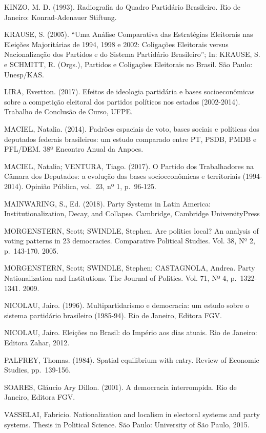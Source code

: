 \documentclass[]{article}
\begin{document}
KINZO, M. D. (1993). Radiografia do Quadro Partidário Brasileiro. Rio de
Janeiro: Konrad-Adenauer Stiftung.

KRAUSE, S. (2005). ``Uma Análise Comparativa das Estratégias Eleitorais
nas Eleições Majoritárias de 1994, 1998 e 2002: Coligações Eleitorais
versus Nacionalização dos Partidos e do Sistema Partidário Brasileiro'';
In: KRAUSE, S. e SCHMITT, R. (Orgs.), Partidos e Coligações Eleitorais
no Brasil. São Paulo: Unesp/KAS.

LIRA, Evertton. (2017). Efeitos de ideologia partidária e bases
socioeconômicas sobre a competição eleitoral dos partidos políticos nos
estados (2002-2014). Trabalho de Conclusão de Curso, UFPE.

MACIEL, Natalia. (2014). Padrões espaciais de voto, bases sociais e
políticas dos deputados federais brasileiros: um estudo comparado entre
PT, PSDB, PMDB e PFL/DEM. 38º Encontro Anual da Anpocs.

MACIEL, Natalia; VENTURA, Tiago. (2017). O Partido dos Trabalhadores na
Câmara dos Deputados: a evolução das bases socioeconômicas e
territoriais (1994-2014). Opinião Pública, vol.~23, nº 1, p.~96-125.

MAINWARING, S., Ed. (2018). Party Systems in Latin America:
Institutionalization, Decay, and Collapse. Cambridge, Cambridge
UniversityPress

MORGENSTERN, Scott; SWINDLE, Stephen. Are politics local? An analysis of
voting patterns in 23 democracies. Comparative Political Studies. Vol.
38, Nº 2, p.~143-170. 2005.

MORGENSTERN, Scott; SWINDLE, Stephen; CASTAGNOLA, Andrea. Party
Nationalization and Institutions. The Journal of Politics. Vol. 71, Nº
4, p.~1322-1341. 2009.

NICOLAU, Jairo. (1996). Multipartidarismo e democracia: um estudo sobre
o sistema partidário brasileiro (1985-94). Rio de Janeiro, Editora FGV.

NICOLAU, Jairo. Eleições no Brasil: do Império aos dias atuais. Rio de
Janeiro: Editora Zahar, 2012.

PALFREY, Thomas. (1984). Spatial equilibrium with entry. Review of
Economic Studies, pp.~139-156.

SOARES, Gláucio Ary Dillon. (2001). A democracia interrompida. Rio de
Janeiro, Editora FGV.

VASSELAI, Fabricio. Nationalization and localism in electoral systems
and party systems. Thesis in Political Science. São Paulo: University of
São Paulo, 2015.
\end{document}
